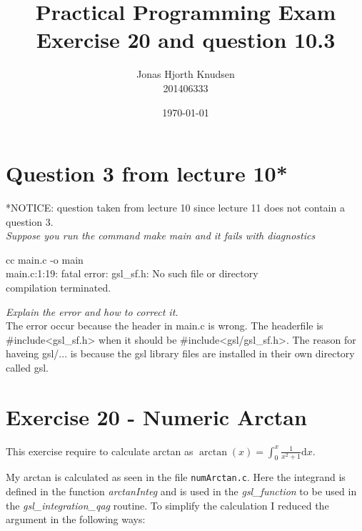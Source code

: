 \documentclass[a4paper,10pt,onecolumn]{article}
\begin{document}
\title{Practical Programming Exam\\ Exercise 20 and question 10.3}
\author{Jonas Hjorth Knudsen\\ 201406333}
\date{\today}

\maketitle



\section{Question 3 from lecture 10*}
*NOTICE: question taken from lecture 10 since lecture 11 does not contain a question 3.\\

\textit{Suppose you run the command \emph{make main} and it fails with diagnostics}

\begin{framed}
cc \hspace{1cm} main.c \hspace{1cm} -o main\\
main.c:1:19: fatal error: gsl\_sf.h: No such file or directory\\
compilation terminated.
\end{framed}

\textit{Explain the error and how to correct it.}\\

The error occur because the header in main.c is wrong. The headerfile is \mbox{\#include\textless gsl\_sf.h\textgreater}
 when it should be \#include\textless gsl/gsl\_sf.h\textgreater.
The reason for haveing gsl/... is because the gsl library files are installed in their own directory called gsl.




\section{Exercise 20 - Numeric Arctan}

This exercise require to calculate arctan as $\arctan(x) = \int_0^x \frac{1}{x^2+1} \mathrm{d}x$.

My arctan is calculated as seen in the file \texttt{numArctan.c}. Here the integrand is defined in the function \emph{arctanInteg} and is used
in the \emph{gsl\_function} to be used in the \emph{gsl\_integration\_qag} routine. To simplify the calculation I reduced the argument in the following ways:
\end{document}
